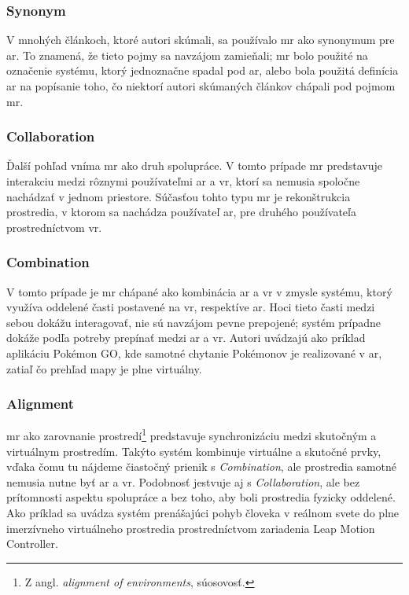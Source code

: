 \subsubsection*{Synonym}
V mnohých článkoch, ktoré autori \cite{speicherWhatMixedReality2019a} skúmali, sa používalo \acrshort{mr} ako synonymum pre \acrshort{ar}. To znamená, že tieto pojmy sa 
navzájom zamieňali; \acrshort{mr} bolo použité na označenie systému, ktorý jednoznačne spadal pod \acrshort{ar}, alebo bola použitá definícia \acrshort{ar} na popísanie toho,
čo niektorí autori skúmaných článkov chápali pod pojmom \acrshort{mr}.

\subsubsection*{Collaboration}
Ďalší pohľad vníma \acrshort{mr} ako druh spolupráce. V tomto prípade \acrshort{mr} predstavuje interakciu medzi rôznymi používateľmi \acrshort{ar} a \acrshort{vr}, ktorí
sa nemusia spoločne nachádzať v jednom priestore. Súčasťou tohto typu \acrshort{mr} je rekonštrukcia prostredia, v ktorom sa nachádza používateľ \acrshort{ar}, pre druhého
používateľa prostredníctvom \acrshort{vr}.

\subsubsection*{Combination}
V tomto prípade je \acrshort{mr} chápané ako kombinácia \acrshort{ar} a \acrshort{vr} v zmysle systému, ktorý využíva oddelené časti postavené na \acrshort{vr}, respektíve
\acrshort{ar}. Hoci tieto časti medzi sebou dokážu interagovať, nie sú navzájom pevne prepojené; systém prípadne dokáže podľa potreby prepínať medzi \acrshort{ar} a
\acrshort{vr}. Autori \cite{speicherWhatMixedReality2019a} uvádzajú ako príklad aplikáciu Pokémon GO, kde samotné chytanie Pokémonov je realizované v \acrshort{ar}, zatiaľ čo 
prehľad mapy je plne virtuálny.

\subsubsection*{Alignment}
\acrshort{mr} ako zarovnanie prostredí\footnote{Z angl. \emph{alignment of environments}, súosovosť.} predstavuje synchronizáciu medzi skutočným a virtuálnym prostredím.
Takýto systém kombinuje virtuálne a skutočné prvky, vďaka čomu tu nájdeme čiastočný prienik s \emph{Combination}, ale prostredia samotné nemusia nutne byť \acrshort{ar}
a \acrshort{vr}. Podobnosť jestvuje aj s \emph{Collaboration}, ale bez prítomnosti aspektu spolupráce a bez toho, aby boli prostredia fyzicky oddelené. Ako príklad sa 
uvádza systém prenášajúci pohyb človeka v reálnom svete do plne imerzívneho virtuálneho prostredia prostredníctvom zariadenia Leap Motion Controller.

